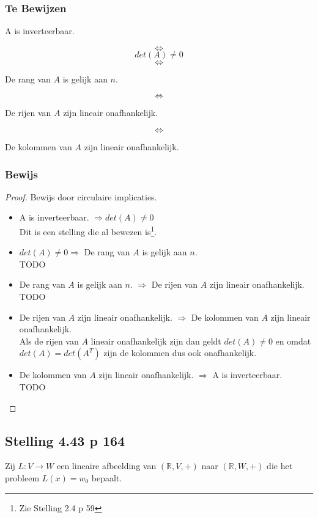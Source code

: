 \documentclass[lineaire_algebra_oplossingen.tex]{subfiles}
\begin{document}
\subsubsection*{Te Bewijzen}
\begin{center}
A is inverteerbaar.
\end{center}
\[\Leftrightarrow\]
\[det(A) \neq 0\]
\[\Leftrightarrow\]
\begin{center}
De rang van $A$ is gelijk aan $n$.
\end{center}
\[\Leftrightarrow\]
\begin{center}
De rijen van $A$ zijn lineair onafhankelijk.
\end{center}
\[\Leftrightarrow\]
\begin{center}
De kolommen van $A$ zijn lineair onafhankelijk.
\end{center}
\subsubsection*{Bewijs}
\begin{proof}
Bewijs door circulaire implicaties.
\begin{itemize}
\item
A is inverteerbaar. $\Rightarrow det(A) \neq 0$\\
Dit is een stelling die al bewezen is\footnote{Zie Stelling 2.4 p 59}.
\item
$det(A) \neq 0 \Rightarrow $ De rang van $A$ is gelijk aan $n$.\\
TODO
\item
De rang van $A$ is gelijk aan $n$. $\Rightarrow $ De rijen van $A$ zijn lineair onafhankelijk.\\
TODO
\item
De rijen van $A$ zijn lineair onafhankelijk. $\Rightarrow$ De kolommen van $A$ zijn lineair onafhankelijk.\\
Als de rijen van $A$ lineair onafhankelijk zijn dan geldt $det(A) \neq 0$ en omdat $det(A) = det(A^T)$ zijn de kolommen dus ook onafhankelijk.
\item
De kolommen van $A$ zijn lineair onafhankelijk. $\Rightarrow$ A is inverteerbaar.\\
TODO
\end{itemize}
\end{proof}

\subsection{Stelling 4.43 p 164}
Zij $L:V\rightarrow W$ een lineaire afbeelding van $(\mathbb{R},V,+)$ naar $(\mathbb{R},W,+)$ die het probleem $L(x) = w_0$ bepaalt.
\end{document}
